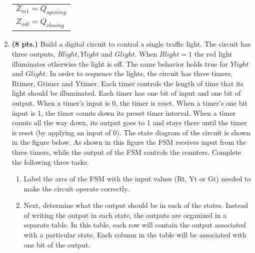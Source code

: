 \begin{enumerate}
\begin{onlysolution}
{\begin{itemize}
                        \begin{tabular}{l}
                            $Z_{m1} = Q_{opening}$ \\
                            $Z_{m0} = Q_{closing}$ \\
                        \end{tabular}
                \end{itemize}
            }
        \end{onlysolution}

    \item \textbf{ (8 pts.)}
        Build a digital circuit to control a single traffic light.  The circuit
        has three outputs, $Rlight, Ylight$ and $ Glight$.  When
        $Rlight=1$ the red light illuminates otherwise the light is off.
        The same behavior holds true for $Ylight$ and $Glight$.  In order
        to sequence the lights, the circuit has three timers, Rtimer, Gtimer and
        Ytimer.  Each timer controls the length of time that its light should be
        illuminated.  Each timer has one bit of input and one bit of output.  When a
        timer's input is 0, the timer is reset.  When a timer's one bit
        input is 1, the timer
        counts down its preset timer interval.  When a timer counts all the way down,
        its output goes to 1 and stays there until the timer is reset (by applying
        an input of 0).  The state diagram of the circuit is shown in the
        figure below.  As shown in this figure the FSM receives input from the
        three timers, while the output of the FSM controls the counters. Complete
        the following three tasks.


        \begin{enumerate}
            \item Label the arcs of the FSM with the input values (Rt, Yt or Gt)
                needed to make the circuit operate correctly.

            \item Next, determine what the output should be in each
                of the states.  Instead of writing the output in each state, the
                outputs are organized in a separate table.  In this table, each
                row will contain the output associated with a particular state.
                Each column in the table will be associated with one bit of the output.


\end{enumerate}
\end{enumerate}
